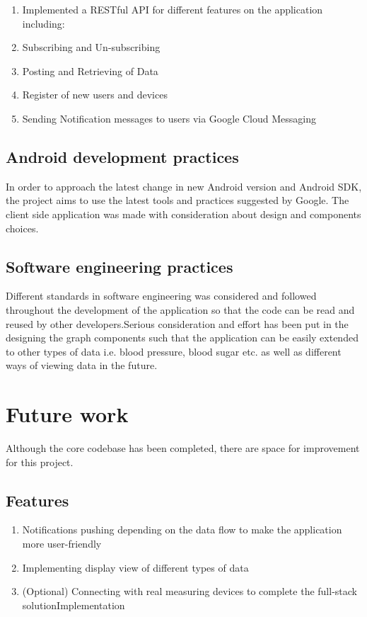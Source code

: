 \begin{enumerate}
    \item Implemented a RESTful API for different features on the application including:
    \item Subscribing and Un-subscribing
    \item Posting and Retrieving of Data
    \item Register of new users and devices
    \item Sending Notification messages to users via Google Cloud Messaging
\end{enumerate}

\subsection{Android development practices}
In order to approach the latest change in new Android version and Android SDK, the project aims to use the latest tools
and practices suggested by Google. The client side application was made with consideration about design and components
choices.

\subsection{Software engineering practices}
Different standards in software engineering was considered and followed throughout the development of the application so
that the code can be read and reused by other developers.Serious consideration and effort has been put in the designing
the graph components such that the application can be easily extended to other types of data i.e. blood pressure, blood
sugar etc. as well as different ways of viewing data in the future.

\section{Future work} \label{sec:Work done so far}
Although the core codebase has been completed, there are space for improvement for this project.
\subsection{Features}
\begin{enumerate}
    \item Notifications pushing depending on the data flow to make the application more
        user-friendly
    \item Implementing display view of different types of data
    \item (Optional) Connecting with real measuring devices
        to complete the full-stack solutionImplementation
\end{enumerate}

